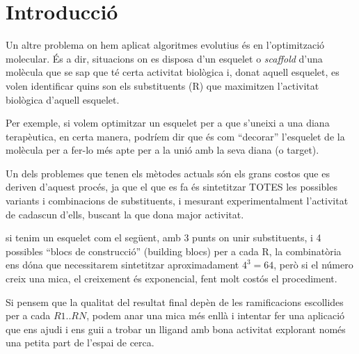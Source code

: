 %

\section{Introducció} %
	\label{sec:Introduccio}
	Un altre problema on hem aplicat algoritmes evolutius és en l'optimització
	molecular.  És a dir, situacions on es disposa d'un esquelet o
	\textit{scaffold} d'una molècula que se sap que té certa activitat biològica
	i, donat aquell esquelet, es volen identificar quins son els substituents
	(R) que maximitzen l'activitat biològica d'aquell esquelet.	

	Per exemple, si volem optimitzar un esquelet per a que s'uneixi a una diana
	terapèutica, en certa manera, podríem dir que és com ``decorar'' l'esquelet
	de la molècula per a fer-lo més apte per a la unió amb la seva diana (o
	target).

	Un dels problemes que tenen els mètodes actuals són els grans costos
	que es deriven d'aquest procés, ja que el que es fa és sintetitzar TOTES les
	possibles variants i combinacions de substituents, i mesurant
	experimentalment l'activitat de cadascun d'ells, buscant la que dona major
	activitat.

	si tenim un esquelet com el següent, amb 3 punts on unir substituents,
	i 4 possibles ``blocs de construcció'' (building blocs) per a cada R, la
	combinatòria ens dóna que necessitarem sintetitzar aproximadament $4^3 =
	64 $, però si el número creix una mica, el creixement és exponencial, fent
	molt costós el procediment.

	Si pensem que la qualitat del resultat final depèn de les
	ramificacions escollides per a cada $R1..RN$, podem anar una mica més enllà i
	intentar fer una aplicació que ens ajudi i ens guii a trobar un lligand amb
	bona activitat explorant només una petita part de l'espai de cerca.
	
